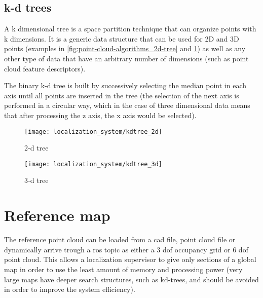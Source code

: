 \subsection{k-d trees}

A k dimensional tree is a space partition technique that can organize points with k dimensions. It is a generic data structure that can be used for 2D and 3D points (examples in \cref{fig:point-cloud-algorithms_2d-tree} and \cref{fig:point-cloud-algorithms_3d-tree}) as well as any other type of data that have an arbitrary number of dimensions (such as point cloud feature descriptors).

The binary k-d tree is built by successively selecting the median point in each axis until all points are inserted in the tree (the selection of the next axis is performed in a circular way, which in the case of three dimensional data means that after processing the z axis, the x axis would be selected).

\begin{savenotes}
\begin{figure}[H]
	\centering
	\begin{minipage}[h]{0.495\textwidth}
		\centering
		\texttt{[image: localization\_system/kdtree\_2d]}
		\caption[2-d tree]{2-d tree\protect\footnotemark}
		\label{fig:point-cloud-algorithms_2d-tree}
	\end{minipage}\hfill
	\begin{minipage}[h]{0.495\textwidth}
		\centering
		\texttt{[image: localization\_system/kdtree\_3d]}
		\caption[3-d tree]{3-d tree\protect\footnotemark}
		\label{fig:point-cloud-algorithms_3d-tree}
	\end{minipage}
\end{figure}
\end{savenotes}



\section{Reference map}

The reference point cloud can be loaded from a \gls{cad} file, point cloud file or dynamically arrive trough a \gls{ros} topic as either a 3 \gls{dof} occupancy grid or 6 \gls{dof} point cloud. This allows a localization supervisor to give only sections of a global map in order to use the least amount of memory and processing power (very large maps have deeper search structures, such as kd-trees, and should be avoided in order to improve the system efficiency).



